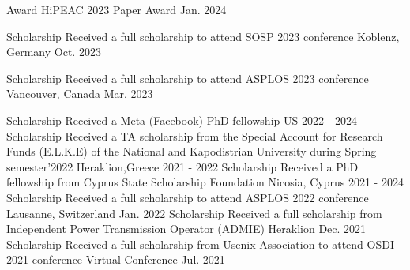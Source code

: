 
\begin{cvhonors}
	\cvhonor
	{Award} %
	{HiPEAC 2023 Paper Award} %
	{} %
	{Jan. 2024} %

	\cvhonor
	{Scholarship} %
	{Received a full scholarship to attend SOSP 2023 conference} %
	{Koblenz, Germany} %
	{Oct. 2023} %

	\cvhonor
	{Scholarship} %
	{Received a full scholarship to attend ASPLOS 2023 conference} %
	{Vancouver, Canada} %
	{Mar. 2023} %

	\cvhonor
	{Scholarship} %
	{Received a Meta (Facebook) PhD fellowship} %
	{US} %
	{2022 - 2024} %
	\cvhonor
	{Scholarship} %
	{Received a TA scholarship from the Special Account for Research Funds (E.L.K.E) of the National and Kapodistrian University during Spring semester’2022} %
	{Heraklion,Greece} %
	{2021 - 2022} %
	\cvhonor
	{Scholarship} %
	{Received a PhD fellowship from Cyprus State Scholarship Foundation} %
	{Nicosia, Cyprus} %
	{2021 - 2024} %
	\cvhonor
	{Scholarship} %
	{Received a full scholarship to attend ASPLOS 2022 conference} %
	{Lausanne, Switzerland} %
	{Jan. 2022} %
	\cvhonor
	{Scholarship} %
	{Received a full scholarship from Independent Power Transmission
		Operator (ADMIE)} %
	{Heraklion} %
	{Dec. 2021} %
	\cvhonor
	{Scholarship} %
	{Received a full scholarship from Usenix Association to attend
		OSDI 2021 conference} %
	{Virtual Conference} %
	{Jul. 2021} %


\end{cvhonors}
